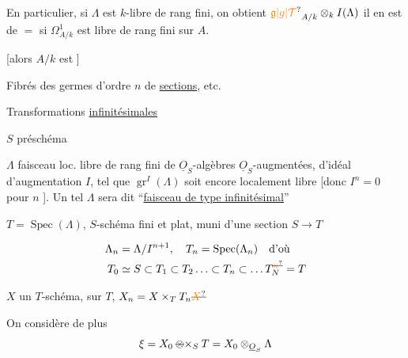 En particulier, si $\Lambda$ est $k$-libre de rang fini, on obtient $\unsure{\mathfrak{g}|g|\mathcal{T}}_{A/k}\otimes_k I(\Lambda)$\unsure{;|,} il en est de $=$  si $\Omega^1_{A/k}$ est libre de rang fini sur $A$.

[alors $A/k$ est  ] 

Fibrés des germes d'ordre $n$ de \uline{sections}, etc.

Transformations \uline{infinitésimales}

$S$ préschéma

$\Lambda$ faisceau loc. libre de rang fini de $\underline{O}_S$-algèbres $\underline{O}_S$-augmentées,  d'idéal d'augmentation $I$, tel que $\operatorname{gr}^{I}(\Lambda)$ soit encore localement libre [donc $I^n=0$ pour $n$ ]. Un tel $\Lambda$ sera dit ``\uline{faisceau de type infinitésimal}''

$T=\operatorname{Spec}(\Lambda)$, $S$-schéma fini et plat, muni d'une section $S\to T$

\[
\begin{aligned}
\Lambda_n&=\Lambda/I^{n+1},\quad T_n=\operatorname{Spec}(\Lambda_n)\quad\text{d'où}\\
T_0&\simeq S\subset T_1\subset T_2\ldots\subset T_n\subset\ldots T_N^{\deleted{\unsure{n}}}=T
\end{aligned}
\]


$X$ un $T$-schéma,  sur $T$, \quad $X_n=X\times_T T_n\deleted{\unsure{X}}$

On considère de plus
\[
\xi=X_0\mathbin{\deleted{\otimes}\times}_S T=X_0\otimes_{\underline{O}_S}\Lambda
\]


